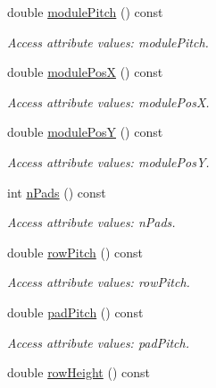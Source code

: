 \begin{DoxyCompactItemize}
double \hyperlink{struct_d_d4hep_1_1_x_m_l_1_1_child_value_a3ee27bff8cbf9f5ae86fa7853ceede91}{modulePitch} () const 
\begin{DoxyCompactList}\small\item\em Access attribute values: modulePitch. \item\end{DoxyCompactList}\item 
double \hyperlink{struct_d_d4hep_1_1_x_m_l_1_1_child_value_a7f99b1eaeb74e8b82682a9c63c3b7c70}{modulePosX} () const 
\begin{DoxyCompactList}\small\item\em Access attribute values: modulePosX. \item\end{DoxyCompactList}\item 
double \hyperlink{struct_d_d4hep_1_1_x_m_l_1_1_child_value_a59bc9319ed923a76164e85800d1241a6}{modulePosY} () const 
\begin{DoxyCompactList}\small\item\em Access attribute values: modulePosY. \item\end{DoxyCompactList}\item 
int \hyperlink{struct_d_d4hep_1_1_x_m_l_1_1_child_value_a5c46fd46ff5e4a19b055d348dade942a}{nPads} () const 
\begin{DoxyCompactList}\small\item\em Access attribute values: nPads. \item\end{DoxyCompactList}\item 
double \hyperlink{struct_d_d4hep_1_1_x_m_l_1_1_child_value_a26817431b8cab9abd3f67e4ad53f7644}{rowPitch} () const 
\begin{DoxyCompactList}\small\item\em Access attribute values: rowPitch. \item\end{DoxyCompactList}\item 
double \hyperlink{struct_d_d4hep_1_1_x_m_l_1_1_child_value_a4df110a147f8ff76d832ff631db83c98}{padPitch} () const 
\begin{DoxyCompactList}\small\item\em Access attribute values: padPitch. \item\end{DoxyCompactList}\item 
double \hyperlink{struct_d_d4hep_1_1_x_m_l_1_1_child_value_aa717d9a434a61f445cdf095ed73261f4}{rowHeight} () const 

\end{DoxyCompactItemize}
